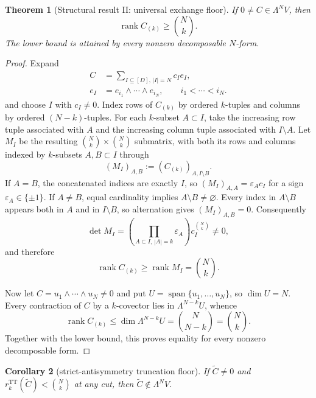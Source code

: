 \documentclass[aps,pra,reprint,superscriptaddress,nofootinbib,longbibliography,showkeys]{revtex4-2}
\newtheorem{theorem}{Theorem}[section]
\newtheorem{corollary}[theorem]{Corollary}
\theoremstyle{definition}
\newcommand{\TT}{\mathrm{TT}}
\newcommand{\rank}{\operatorname{rank}}
\begin{document}
\begin{theorem}[Structural result II: universal exchange floor]
If $0\ne C\in\Lambda^N V$, then
\[
\rank C_{(k)}\ge \binom{N}{k}.
\]
The lower bound is attained by every nonzero decomposable $N$-form.
\label{thm:exchange-floor}
\end{theorem}

\begin{proof}
Expand
\begin{align}
C&=\sum_{I\subseteq[D],\,|I|=N}c_I e_I,\nonumber\\
e_I&=e_{i_1}\wedge\cdots\wedge e_{i_N},
\qquad i_1<\cdots<i_N.
\end{align}
and choose $I$ with $c_I\ne0$.  Index rows of $C_{(k)}$ by ordered
$k$-tuples and columns by ordered $(N-k)$-tuples.  For each $k$-subset
$A\subset I$, take the increasing row tuple associated with $A$ and the
increasing column tuple associated with $I\setminus A$.  Let $M_I$ be the
resulting $\binom Nk\times\binom Nk$ submatrix, with both its rows and columns
indexed by $k$-subsets $A,B\subset I$ through
\begin{equation}
(M_I)_{A,B}:=(C_{(k)})_{A,I\setminus B}.
\end{equation}
If $A=B$, the concatenated indices are exactly $I$, so
$(M_I)_{A,A}=\varepsilon_Ac_I$ for a sign $\varepsilon_A\in\{\pm1\}$.  If
$A\ne B$, equal cardinality implies $A\setminus B\ne\varnothing$.  Every
index in $A\setminus B$ appears both in $A$ and in $I\setminus B$, so
alternation gives $(M_I)_{A,B}=0$.  Consequently
\begin{equation}
\det M_I=\left(\prod_{A\subset I,\,|A|=k}\varepsilon_A\right)
c_I^{\binom Nk}\ne0,
\end{equation}
and therefore
\begin{equation}
\rank C_{(k)}\ge\rank M_I=\binom Nk.
\end{equation}

Now let $C=u_1\wedge\cdots\wedge u_N\ne0$ and put
$U=\operatorname{span}\{u_1,\ldots,u_N\}$, so $\dim U=N$.  Every contraction
of $C$ by a $k$-covector lies in $\Lambda^{N-k}U$, whence
\begin{equation}
\rank C_{(k)}\le\dim\Lambda^{N-k}U=\binom N{N-k}=\binom Nk.
\end{equation}
Together with the lower bound, this proves equality for every nonzero
decomposable form.
\end{proof}

\begin{corollary}[strict-antisymmetry truncation floor]
If $\widetilde C\ne0$ and
$r_k^{\TT}(\widetilde C)<\binom{N}{k}$ at any cut, then
$\widetilde C\notin\Lambda^N V$.
\end{corollary}
\end{document}
